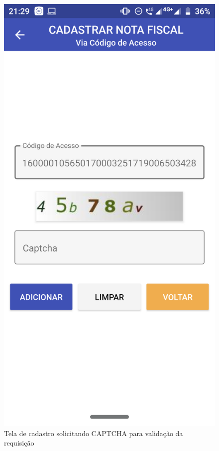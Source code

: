\newpage
\begin{figure}[h]
    \centering
    \includegraphics[scale=0.15]{tcc/figures/app/app_codigo_acesso_captcha.png}
    \caption{Tela de cadastro solicitando CAPTCHA para validação da requisição}
    \label{appCodigoAcessoCaptchaFig}
\end{figure}

